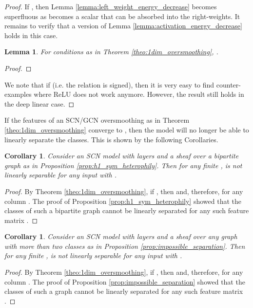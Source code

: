 \documentclass{article}
\newtheorem{lemma}[theorem]{Lemma}
\newtheorem{corollary}[theorem]{Corollary}
\begin{document}
\OneDimOversmoothing*
\begin{proof}
If , then Lemma \ref{lemma:left_weight_energy_decrease} becomes superfluous as  becomes a scalar that can be absorbed into the right-weights. It remains to verify that a version of Lemma \ref{lemma:activation_energy_decrease} holds in this case.

\begin{lemma}
For conditions as in Theorem \ref{theo:1dim_oversmoothing}, .
\end{lemma}

\begin{proof}

\end{proof}
We note that if  (i.e. the relation is signed), then it is very easy to find counter-examples where ReLU does not work anymore. However, the result still holds in the deep linear case. 
\end{proof}

If the features of an SCN/GCN oversmoothing as in Theorem \ref{theo:1dim_oversmoothing} converge to , then the model will no longer be able to linearly separate the classes. This is shown by the following Corollaries. 


\begin{corollary}\label{cor:gcn_one}
Consider an SCN model  with  layers and a sheaf  over a bipartite graph  as in Proposition \ref{prop:h1_sym_heterophily}. Then for any finite ,  is not linearly separable for any input with .  
\end{corollary}

\begin{proof}
By Theorem \ref{theo:1dim_oversmoothing}, if , then  and, therefore,  for any column . The proof of Proposition \ref{prop:h1_sym_heterophily} showed that the classes of such a bipartite graph cannot be linearly separated for any such feature matrix . 
\end{proof}

\begin{corollary}\label{cor:gcn_two}
Consider an SCN model  with  layers and a sheaf  over any graph  with more than two classes as in Proposition \ref{prop:impossible_separation}. Then for any finite ,  is not linearly separable for any input with .  
\end{corollary}

\begin{proof}
By Theorem \ref{theo:1dim_oversmoothing}, if , then  and, therefore,  for any column . The proof of Proposition \ref{prop:impossible_separation} showed that the classes of such a graph cannot be linearly separated for any such feature matrix . \end{proof}
\end{document}
